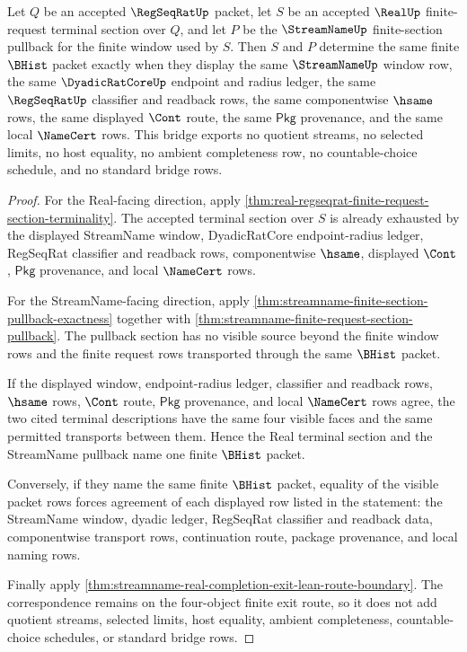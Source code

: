 \begin{theorem}
\label{thm:real-streamname-finite-request-terminal-bridge}
Let $Q$ be an accepted $\RegSeqRatUp$ packet, let $S$ be an accepted $\RealUp$ finite-request terminal section over $Q$, and let $P$ be the $\StreamNameUp$ finite-section pullback for the finite window used by $S$. Then $S$ and $P$ determine the same finite $\BHist$ packet exactly when they display the same $\StreamNameUp$ window row, the same $\DyadicRatCoreUp$ endpoint and radius ledger, the same $\RegSeqRatUp$ classifier and readback rows, the same componentwise $\hsame$ rows, the same displayed $\Cont$ route, the same $\mathsf{Pkg}$ provenance, and the same local $\NameCert$ rows. This bridge exports no quotient streams, no selected limits, no host equality, no ambient completeness row, no countable-choice schedule, and no standard bridge rows.
\end{theorem}
\begin{proof}
For the Real-facing direction, apply \autoref{thm:real-regseqrat-finite-request-section-terminality}. The accepted terminal section over $S$ is already exhausted by the displayed StreamName window, DyadicRatCore endpoint-radius ledger, RegSeqRat classifier and readback rows, componentwise $\hsame$, displayed $\Cont$, $\mathsf{Pkg}$ provenance, and local $\NameCert$ rows.

For the StreamName-facing direction, apply \autoref{thm:streamname-finite-section-pullback-exactness} together with \autoref{thm:streamname-finite-request-section-pullback}. The pullback section has no visible source beyond the finite window rows and the finite request rows transported through the same $\BHist$ packet.

If the displayed window, endpoint-radius ledger, classifier and readback rows, $\hsame$ rows, $\Cont$ route, $\mathsf{Pkg}$ provenance, and local $\NameCert$ rows agree, the two cited terminal descriptions have the same four visible faces and the same permitted transports between them. Hence the Real terminal section and the StreamName pullback name one finite $\BHist$ packet.

Conversely, if they name the same finite $\BHist$ packet, equality of the visible packet rows forces agreement of each displayed row listed in the statement: the StreamName window, dyadic ledger, RegSeqRat classifier and readback data, componentwise transport rows, continuation route, package provenance, and local naming rows.

Finally apply \autoref{thm:streamname-real-completion-exit-lean-route-boundary}. The correspondence remains on the four-object finite exit route, so it does not add quotient streams, selected limits, host equality, ambient completeness, countable-choice schedules, or standard bridge rows.
\end{proof}

